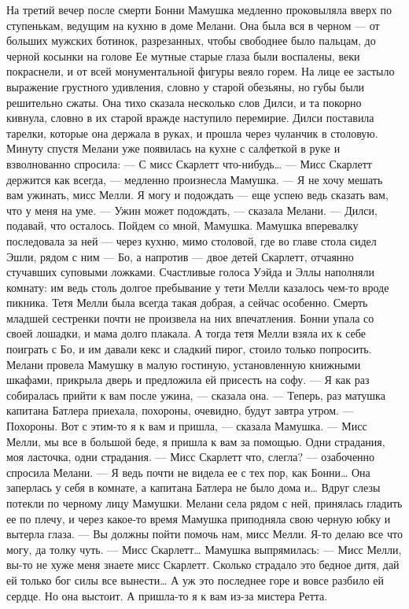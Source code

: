 На третий вечер после смерти Бонни Мамушка медленно проковыляла вверх по ступенькам, ведущим на кухню в доме Мелани. Она была вся в черном — от больших мужских ботинок, разрезанных, чтобы свободнее было пальцам, до черной косынки на голове Ее мутные старые глаза были воспалены, веки покраснели, и от всей монументальной фигуры веяло горем. На лице ее застыло выражение грустного удивления, словно у старой обезьяны, но губы были решительно сжаты.
Она тихо сказала несколько слов Дилси, и та покорно кивнула, словно в их старой вражде наступило перемирие. Дилси поставила тарелки, которые она держала в руках, и прошла через чуланчик в столовую. Минуту спустя Мелани уже появилась на кухне с салфеткой в руке и взволнованно спросила:
— С мисс Скарлетт что-нибудь…
— Мисс Скарлетт держится как всегда, — медленно произнесла Мамушка. — Я не хочу мешать вам ужинать, мисс Мелли. Я могу и подождать — еще успею ведь сказать вам, что у меня на уме.
— Ужин может подождать, — сказала Мелани. — Дилси, подавай, что осталось. Пойдем со мной, Мамушка.
Мамушка вперевалку последовала за ней — через кухню, мимо столовой, где во главе стола сидел Эшли, рядом с ним — Бо, а напротив — двое детей Скарлетт, отчаянно стучавших суповыми ложками. Счастливые голоса Уэйда и Эллы наполняли комнату: им ведь столь долгое пребывание у тети Мелли казалось чем-то вроде пикника. Тетя Мелли была всегда такая добрая, а сейчас особенно. Смерть младшей сестренки почти не произвела на них впечатления. Бонни упала со своей лошадки, и мама долго плакала. А тогда тетя Мелли взяла их к себе поиграть с Бо, и им давали кекс и сладкий пирог, стоило только попросить.
Мелани провела Мамушку в малую гостиную, установленную книжными шкафами, прикрыла дверь и предложила ей присесть на софу.
— Я как раз собиралась прийти к вам после ужина, — сказала она. — Теперь, раз матушка капитана Батлера приехала, похороны, очевидно, будут завтра утром.
— Похороны. Вот с этим-то я к вам и пришла, — сказала Мамушка. — Мисс Мелли, мы все в большой беде, я пришла к вам за помощью. Одни страдания, моя ласточка, одни страдания.
— Мисс Скарлетт что, слегла? — озабоченно спросила Мелани. — Я ведь почти не видела ее с тех пор, как Бонни… Она заперлась у себя в комнате, а капитана Батлера не было дома и…
Вдруг слезы потекли по черному лицу Мамушки. Мелани села рядом с ней, принялась гладить ее по плечу, и через какое-то время Мамушка приподняла свою черную юбку и вытерла глаза.
— Вы должны пойти помочь нам, мисс Мелли. Я-то делаю все что могу, да толку чуть.
— Мисс Скарлетт… Мамушка выпрямилась:
— Мисс Мелли, вы-то не хуже меня знаете мисс Скарлетт. Сколько страдало это бедное дитя, дай ей только бог силы все вынести… А уж это последнее горе и вовсе разбило ей сердце. Но она выстоит. А пришла-то я к вам из-за мистера Ретта.
